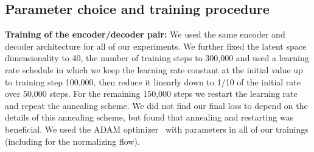 \documentclass[10pt]{article} \usepackage[accepted]{tmlr}
\begin{document}
\subsection{Parameter choice and training procedure}
\label{sec:param_choice}
\hfill \break
\textbf{Training of the encoder/decoder pair:} We used the same encoder and decoder architecture for all of our experiments. We further fixed the latent space dimensionality to 40, the number of training steps to 300,000 and used a learning rate schedule in which we keep the learning rate constant at the initial value up to training step 100,000, then reduce it linearly down to 1/10 of the initial rate over 50,000 steps. For the remaining 150,000 steps we restart the learning rate and repeat the annealing scheme. We did not find our final loss to depend on the details of this annealing scheme, but found that annealing and restarting was beneficial. We used the ADAM optimizer~\citep{KingmaB14} with parameters  in all of our trainings (including for the normalizing flow).
\end{document}
